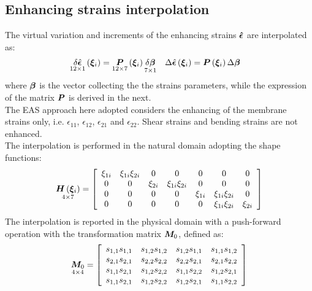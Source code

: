 \subsection{Enhancing strains interpolation}
The virtual variation and increments of the enhancing strains $\T{\hat{\epsilon}}$ are interpolated as:
\begin{align}
\underset{12 \times 1}{\delta \hat{\T{\epsilon}}} \valxii & = \underset{12 \times 7}{\TT{P}} \valxii \underset{7 \times 1}{ \delta \T{\beta}} &  \Delta \hat{\T{\epsilon}}\valxii & = \TT{P}\valxii \Delta \T{\beta}
\end{align}
where $\T{\beta}$ is the vector collecting the the strains parameters, while the expression of the matrix $\TT{P}$ is derived in the next. \\
The EAS approach here adopted considers the enhancing of the membrane strains only, i.e. $\epsilon_{11}$, $\epsilon_{12}$, $\epsilon_{21}$ and $\epsilon_{22}$. Shear strains and bending strains are not enhanced.\\
The interpolation is performed in the natural domain adopting the shape functions:
\begin{equation}
\underset{ 4 \times 7 } { \TT{H} \valxii } =
\sqbr{ \matr{ c c c c c c c }{
\xi_{1i} & \xi_{1i} \xi_{2i} &  0    &      0      &   0   &      0      &   0     \\
  0   &      0      & \xi_{2i} & \xi_{1i} \xi_{2i} &   0   &      0      &   0     \\
  0   &      0      &  0    &      0      & \xi_{1i} & \xi_{1i} \xi_{2i} &   0      \\
  0   &      0      &  0    &      0      &   0   & \xi_{1i} \xi_{2i} & \xi_{2i}
}}
\end{equation}
The interpolation is reported in the physical domain with a push-forward operation with the transformation matrix $\TT{M}_0$, defined as:
\begin{equation}
\underset{ 4 \times 4 } { \TT{M}_0 } =
\sqbr{ \matr{ c c c c}{
s_{ 1, 1 } s_{ 1, 1 } & s_{ 1, 2 } s_{ 1, 2 } & s_{ 1, 2 } s_{ 1, 1 } &  s_{ 1, 1 } s_{ 1, 2 } \\
s_{ 2, 1 } s_{ 2, 1 } & s_{ 2, 2 } s_{ 2, 2 } & s_{ 2, 2 } s_{ 2, 1 } &  s_{ 2, 1 } s_{ 2, 2 } \\
s_{ 1, 1 } s_{ 2, 1 } & s_{ 1, 2 } s_{ 2, 2 } & s_{ 1, 1 } s_{ 2, 2 } &  s_{ 1, 2 } s_{ 2, 1 } \\
s_{ 1, 1 } s_{ 2, 1 } & s_{ 1, 2 } s_{ 2, 2 } & s_{ 1, 2 } s_{ 2, 1 } &  s_{ 1, 1 } s_{ 2, 2 }
}}
\end{equation}

